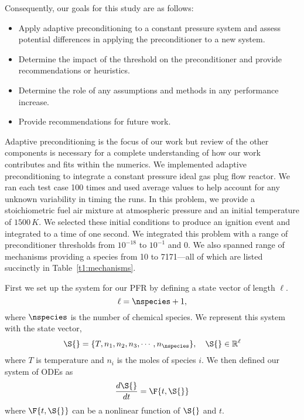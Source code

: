 Consequently, our goals for this study are as follows:
\begin{itemize}
    \item Apply adaptive preconditioning to a constant pressure system and assess potential differences in applying the preconditioner to a new system.
    \item Determine the impact of the threshold on the preconditioner and provide recommendations or heuristics.
    \item Determine the role of any assumptions and methods in any performance increase.
    \item Provide recommendations for future work.
\end{itemize}


\label{p1:methods-section}
Adaptive preconditioning is the focus of our work but review of
the other components is necessary for a complete understanding of how
our work contributes and fits within the numerics.
We implemented adaptive preconditioning to integrate a constant pressure ideal gas plug flow reactor.
We ran each test case 100 times and used average values to help account for any unknown variability in timing the runs.
In this problem, we provide a stoichiometric fuel air mixture at atmospheric pressure and an initial temperature of $1500\,K$.
We selected these initial conditions to produce an ignition event and integrated to a time of one second.
We integrated this problem with a range of preconditioner thresholds from $10^{-18}$ to $10^{-1}$ and 0.
We also spanned range of mechanisms providing a species from 10 to 7171---all of which are listed succinctly in Table~\ref{t1:mechanisms}.

First we set up the system for our PFR by defining a state vector of length $\ell$.
\begin{equation}
    \ell = \nspecies + 1,
\end{equation}
where $\nspecies$ is the number of chemical species.
We represent this system with the state vector,
\begin{equation}
    \S{} = \{T, n_1, n_2, n_3, \cdots, n_{\nspecies}\},\quad\S{}\in\mathbb{R}^\ell
\end{equation}
where $T$ is temperature and $n_i$ is the moles of species $i$.
We then defined our system of ODEs as
\begin{equation}
    \label{eq:ode-system}
    \frac{d\S{}}{dt} = \F{t,\S{}}
\end{equation}
where $\F{t,\S{}}$ can be a nonlinear function of $\S{}$ and $t$.

